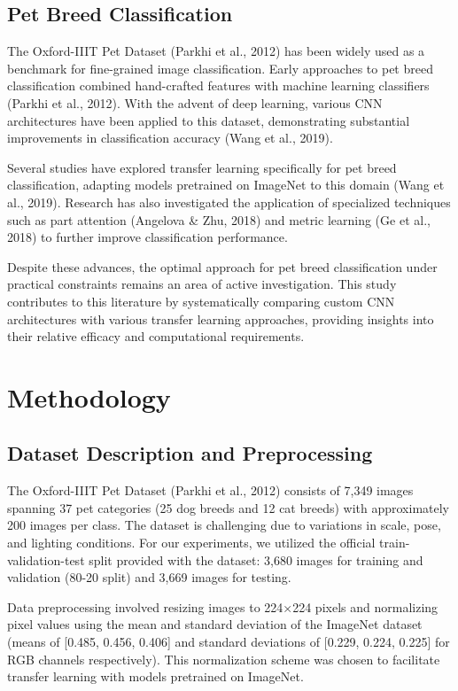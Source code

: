 \documentclass[
]{article}
\begin{document}
\subsection{Pet Breed Classification}\label{pet-breed-classification}

The Oxford-IIIT Pet Dataset (Parkhi et al., 2012) has been widely used
as a benchmark for fine-grained image classification. Early approaches
to pet breed classification combined hand-crafted features with machine
learning classifiers (Parkhi et al., 2012). With the advent of deep
learning, various CNN architectures have been applied to this dataset,
demonstrating substantial improvements in classification accuracy (Wang
et al., 2019).

Several studies have explored transfer learning specifically for pet
breed classification, adapting models pretrained on ImageNet to this
domain (Wang et al., 2019). Research has also investigated the
application of specialized techniques such as part attention (Angelova
\& Zhu, 2018) and metric learning (Ge et al., 2018) to further improve
classification performance.

Despite these advances, the optimal approach for pet breed
classification under practical constraints remains an area of active
investigation. This study contributes to this literature by
systematically comparing custom CNN architectures with various transfer
learning approaches, providing insights into their relative efficacy and
computational requirements.

\section{Methodology}\label{methodology}

\subsection{Dataset Description and
Preprocessing}\label{dataset-description-and-preprocessing}

The Oxford-IIIT Pet Dataset (Parkhi et al., 2012) consists of 7,349
images spanning 37 pet categories (25 dog breeds and 12 cat breeds) with
approximately 200 images per class. The dataset is challenging due to
variations in scale, pose, and lighting conditions. For our experiments,
we utilized the official train-validation-test split provided with the
dataset: 3,680 images for training and validation (80-20 split) and
3,669 images for testing.

Data preprocessing involved resizing images to 224×224 pixels and
normalizing pixel values using the mean and standard deviation of the
ImageNet dataset (means of {[}0.485, 0.456, 0.406{]} and standard
deviations of {[}0.229, 0.224, 0.225{]} for RGB channels respectively).
This normalization scheme was chosen to facilitate transfer learning
with models pretrained on ImageNet.
\end{document}
